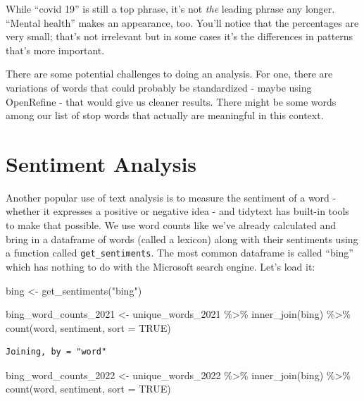 \documentclass[
  letterpaper,
  DIV=11,
  numbers=noendperiod]{scrreprt}
\newenvironment{Shaded}{\begin{snugshade}}{\end{snugshade}}
\newcommand{\AttributeTok}[1]{\textcolor[rgb]{0.40,0.45,0.13}{#1}}
\newcommand{\ConstantTok}[1]{\textcolor[rgb]{0.56,0.35,0.01}{#1}}
\newcommand{\FunctionTok}[1]{\textcolor[rgb]{0.28,0.35,0.67}{#1}}
\newcommand{\NormalTok}[1]{\textcolor[rgb]{0.00,0.23,0.31}{#1}}
\newcommand{\OtherTok}[1]{\textcolor[rgb]{0.00,0.23,0.31}{#1}}
\newcommand{\SpecialCharTok}[1]{\textcolor[rgb]{0.37,0.37,0.37}{#1}}
\newcommand{\StringTok}[1]{\textcolor[rgb]{0.13,0.47,0.30}{#1}}
\begin{document}
While ``covid 19'' is still a top phrase, it's not \emph{the} leading
phrase any longer. ``Mental health'' makes an appearance, too. You'll
notice that the percentages are very small; that's not irrelevant but in
some cases it's the differences in patterns that's more important.

There are some potential challenges to doing an analysis. For one, there
are variations of words that could probably be standardized - maybe
using OpenRefine - that would give us cleaner results. There might be
some words among our list of stop words that actually are meaningful in
this context.

\hypertarget{sentiment-analysis}{%
\section{Sentiment Analysis}\label{sentiment-analysis}}

Another popular use of text analysis is to measure the sentiment of a
word - whether it expresses a positive or negative idea - and tidytext
has built-in tools to make that possible. We use word counts like we've
already calculated and bring in a dataframe of words (called a lexicon)
along with their sentiments using a function called
\texttt{get\_sentiments}. The most common dataframe is called ``bing''
which has nothing to do with the Microsoft search engine. Let's load it:

\begin{Shaded}
\begin{Highlighting}[]
\NormalTok{bing }\OtherTok{\textless{}{-}} \FunctionTok{get\_sentiments}\NormalTok{(}\StringTok{"bing"}\NormalTok{)}

\NormalTok{bing\_word\_counts\_2021 }\OtherTok{\textless{}{-}}\NormalTok{ unique\_words\_2021 }\SpecialCharTok{\%\textgreater{}\%}
  \FunctionTok{inner\_join}\NormalTok{(bing) }\SpecialCharTok{\%\textgreater{}\%}
  \FunctionTok{count}\NormalTok{(word, sentiment, }\AttributeTok{sort =} \ConstantTok{TRUE}\NormalTok{)}
\end{Highlighting}
\end{Shaded}

\begin{verbatim}
Joining, by = "word"
\end{verbatim}

\begin{Shaded}
\begin{Highlighting}[]
\NormalTok{bing\_word\_counts\_2022 }\OtherTok{\textless{}{-}}\NormalTok{ unique\_words\_2022 }\SpecialCharTok{\%\textgreater{}\%}
  \FunctionTok{inner\_join}\NormalTok{(bing) }\SpecialCharTok{\%\textgreater{}\%}
  \FunctionTok{count}\NormalTok{(word, sentiment, }\AttributeTok{sort =} \ConstantTok{TRUE}\NormalTok{)}
\end{Highlighting}
\end{Shaded}
\end{document}
